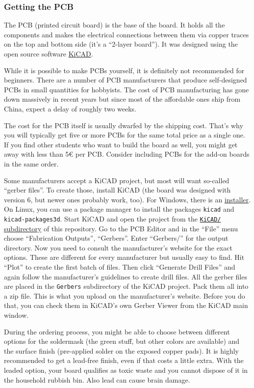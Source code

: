 \documentclass{article}
\newcommand{\file}[1]{\texttt{#1}}
\begin{document}
\subsubsection{Getting the PCB}\label{sec:pcb}
The PCB (printed circuit board) is the base of the board. It holds all the components and makes the electrical connections between them via copper traces on the top and bottom side (it's a ``2-layer board''). It was designed using the open source software \href{https://www.kicad.org/}{KiCAD}. 

While it is possible to make PCBs yourself, it is definitely not recommended for beginners. There are a number of PCB manufacturers that produce self-designed PCBs in small quantities for hobbyists. The cost of PCB manufacturing has gone down massively in recent years but since most of the affordable ones ship from China, expect a delay of roughly two weeks. 

The cost for the PCB itself is usually dwarfed by the shipping cost. That's why you will typically get five or more PCBs for the same total price as a single one. If you find other students who want to build the board as well, you might get away with less than 5\euro{} per PCB. Consider including PCBs for the add-on boards in the same order. 

Some manufacturers accept a KiCAD project, but most will want so-called ``gerber files''. To create those, install KiCAD (the board was designed with version 6, but newer ones probably work, too). For Windows, there is an \href{https://www.kicad.org/download/windows/}{installer}. On Linux, you can use a package manager to install the packages \texttt{kicad} and \texttt{kicad-packages3d}. 
Start KiCAD and open the project from the \href{../KiCAD/}{\file{KiCAD/} subdirectory} of this repository. Go to the PCB Editor and in the ``File'' menu choose ``Fabrication Outputs'', ``Gerbers''. Enter ``Gerbers/'' for the output directory. Now you need to consult the manufacturer's website for the exact options. These are different for every manufacturer but usually easy to find. Hit ``Plot'' to create the first batch of files. Then click ``Generate Drill Files'' and again follow the manufacturer's guidelines to create drill files. All the gerber files are placed in the \texttt{Gerbers} subdirectory of the KiCAD project. Pack them all into a zip file. This is what you upload on the manufacturer's website. Before you do that, you can check them in KiCAD's own Gerber Viewer from the KiCAD main window. 

During the ordering process, you might be able to choose between different options for the soldermask (the green stuff, but other colors are available) and the surface finish (pre-applied solder on the exposed copper pads). It is highly recommended to get a lead-free finish, even if that costs a little extra. With the leaded option, your board qualifies as toxic waste and you cannot dispose of it in the household rubbish bin. Also lead can cause brain damage. 
\end{document}
